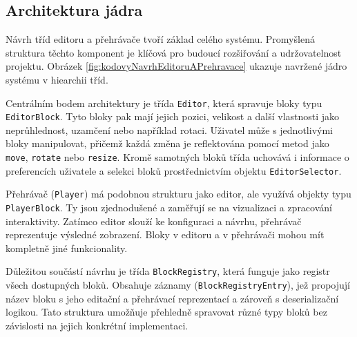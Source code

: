 

\subsection{Architektura jádra}

Návrh tříd editoru a přehrávače tvoří základ celého systému. 
Promyšlená struktura těchto komponent je klíčová pro budoucí rozšiřování a udržovatelnost projektu.
Obrázek \ref{fig:kodovyNavrhEditoruAPrehravace} ukazuje navržené jádro systému v hiearchii tříd.

Centrálním bodem architektury je třída \texttt{Editor}, která spravuje bloky typu \texttt{EditorBlock}. 
Tyto bloky pak mají jejich pozici, velikost a další vlastnosti jako neprůhlednost, uzamčení nebo například rotaci. 
Uživatel může s jednotlivými bloky manipulovat, přičemž každá změna je reflektována pomocí metod jako \texttt{move}, \texttt{rotate} nebo \texttt{resize}.
Kromě samotných bloků třída uchovává i informace o preferencích uživatele a selekci bloků prostřednictvím objektu \texttt{EditorSelector}.

Přehrávač (\texttt{Player}) má podobnou strukturu jako editor, ale využívá objekty typu \texttt{PlayerBlock}. 
Ty jsou zjednodušené a zaměřují se na vizualizaci a zpracování interaktivity. 
Zatímco editor slouží ke konfiguraci a návrhu, přehrávač reprezentuje výsledné zobrazení.
Bloky v editoru a v přehrávači mohou mít kompletně jiné funkcionality.

Důležitou součástí návrhu je třída \texttt{BlockRegistry}, která funguje jako registr všech dostupných bloků. 
Obsahuje záznamy (\texttt{BlockRegistryEntry}), jež propojují název bloku s jeho editační a přehrávací reprezentací a zároveň s deserializační logikou. 
Tato struktura umožňuje přehledně spravovat různé typy bloků bez závislosti na jejich konkrétní implementaci.

